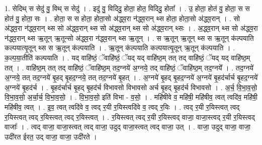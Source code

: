 \documentclass[17pt]{extarticle}
\begin{document}
1. सेदिथ् स सेदु॑ वु॒ विथ् स सेदु॑ । . इदु॑ वु॒ विदिदु॒ होता॒ होत॒ विदिदु॒ होता᳚ । . उ॒ होता॒ होत॑ वु॒ होता॒ स स होत॑ वु॒ होता॒ सः । . होता॒ स स होता॒ होता॒सो अ॑द्ध्व॒रा न॑द्ध्व॒रान् थ्स होता॒ होता॒सो अ॑द्ध्व॒रान् । . सो अ॑द्ध्व॒रा न॑द्ध्व॒रान् थ्स सो अ॑द्ध्व॒रान् थ्स सो अ॑द्ध्व॒रान् थ्स सो अ॑द्ध्व॒रान् थ्सः । . अ॒द्ध्व॒रान् थ्स सो अ॑द्ध्व॒रा न॑द्ध्व॒रान् थ्स ऋ॒तून् ऋ॒तून्सो अ॑द्ध्व॒रा न॑द्ध्व॒रान् थ्स ऋ॒तून् । . स ऋ॒तून् ऋ॒तून् थ्स स ऋ॒तून् क॑ल्पयाति कल्पयात्यृ॒तून् थ्स स ऋ॒तून् क॑ल्पयाति । . ऋ॒तून् क॑ल्पयाति कल्पयात्यृ॒तून् ऋ॒तून् क॑ल्पयाति । . क॒ल्प॒या॒तीति॑ कल्पयाति । . यद् वाहि॑ष्ठं॒ ॅवाहि॑ष्ठं॒ ॅयद् यद् वाहि॑ष्ठ॒म् तत् तद् वाहि॑ष्ठं॒ ॅयद् यद् वाहि॑ष्ठ॒म् तत् । . वाहि॑ष्ठ॒म् तत् तद् वाहि॑ष्ठं॒ ॅवाहि॑ष्ठ॒म् तद॒ग्नये॑ अ॒ग्नये॒ तद् वाहि॑ष्ठं॒ ॅवाहि॑ष्ठ॒म् तद॒ग्नये᳚ । . तद॒ग्नये॑ अ॒ग्नये॒ तत् तद॒ग्नये॑ बृ॒हद् बृ॒हद॒ग्नये॒ तत् तद॒ग्नये॑ बृ॒हत् । . अ॒ग्नये॑ बृ॒हद् बृ॒हद॒ग्नये॑ अ॒ग्नये॑ बृ॒हद॑र्चार्च बृ॒हद॒ग्नये॑ अ॒ग्नये॑ बृ॒हद॑र्च । . बृ॒हद॑र्चार्च बृ॒हद् बृ॒हद॑र्च विभावसो विभावसो अर्च बृ॒हद् बृ॒हद॑र्च विभावसो । . अ॒र्च॒ वि॒भा॒व॒सो॒ वि॒भा॒व॒सो॒ अ॒र्चा॒र्च॒ वि॒भा॒व॒सो॒ । . वि॒भा॒व॒सो॒ इति॑ विभा - व॒सो॒ । . महि॑षीवे व॒ महि॑षी॒ महि॑षीव॒ त्वत् त्वदि॑व॒ महि॑षी॒ महि॑षीव॒ त्वत् । . इ॒व॒ त्वत् त्वदि॑वे व॒ त्वद् र॒यी र॒यिस्त्वदि॑वे व॒ त्वद् र॒यिः । . त्वद् र॒यी र॒यिस्त्वत् त्वद् र॒यिस्त्वत् त्वद् र॒यिस्त्वत् त्वद् र॒यिस्त्वत् । . र॒यिस्त्वत् त्वद् र॒यी र॒यिस्त्वद् वाजा॒ वाजा॒स्त्वद् र॒यी र॒यिस्त्वद् वाजाः᳚ । . त्वद् वाजा॒ वाजा॒स्त्वत् त्वद् वाजा॒ उदुद् वाजा॒स्त्वत् त्वद् वाजा॒ उत् । . वाजा॒ उदुद् वाजा॒ वाजा॒ उदी॑रत ईरत॒ उद् वाजा॒ वाजा॒ उदी॑रते । \newline
\end{document}
